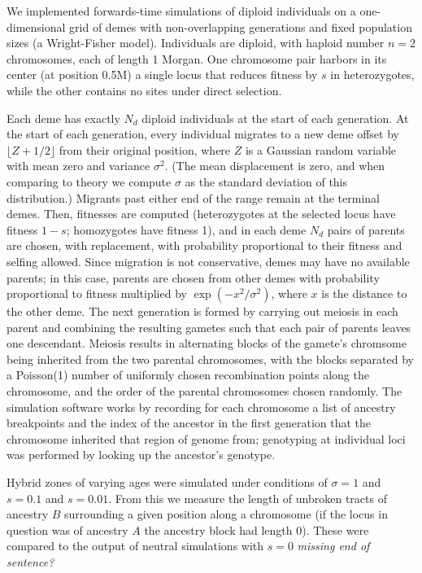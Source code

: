 \documentclass[11pt,letterpaper]{article}
\newcommand{\plr}[1]{{\em \color{blue} #1}}
\begin{document}
We implemented forwards-time simulations of diploid individuals on a one-dimensional grid of demes
with non-overlapping generations and fixed population sizes (a Wright-Fisher model). Individuals are diploid, with haploid number $n=2$ chromosomes, each of length 1 Morgan. One chromosome pair harbors in its center (at position 0.5M) a single locus that reduces fitness by $s$ in heterozygotes, while the other contains no sites under direct selection.

Each deme has exactly $N_d$ diploid individuals at the start of each generation.
At the start of each generation, every individual migrates to a new deme  offset by $\lfloor Z + 1/2 \rfloor$ from their original position,
where $Z$ is a Gaussian random variable with mean zero and variance $\sigma^2$.
(The mean displacement is zero, and when comparing to theory we compute $\sigma$ as the standard deviation of this distribution.)
Migrants past either end of the range remain at the terminal demes.
Then, 
fitnesses are computed (heterozygotes at the selected locus have fitness $1-s$; homozygotes have fitness 1),
and in each deme $N_d$ pairs of parents are chosen, with replacement,
with probability proportional to their fitness and selfing allowed.
Since migration is not conservative, demes may have no available parents;
in this case, parents are chosen from other demes with probability proportional to fitness
multiplied by $\exp(-x^2/\sigma^2)$, where $x$ is the distance to the other deme.
The next generation is formed by carrying out meiosis in each parent
and combining the resulting gametes such that each pair of parents leaves one descendant.
Meiosis results in alternating blocks of the gamete's chromsome
being inherited from the two parental chromosomes,
with the blocks separated by a Poisson(1) number of uniformly chosen recombination points along the chromosome,
and the order of the parental chromosomes chosen randomly.
The simulation software works by recording for each chromosome
a list of ancestry breakpoints and the index of the ancestor in the first generation
that the chromosome inherited that region of genome from;
genotyping at individual loci was performed by looking up the ancestor's genotype.

Hybrid zones of varying ages were simulated under conditions of $\sigma=1$ and $s=0.1$ and $s=0.01$. From this we measure the length of unbroken tracts of ancestry $B$ surrounding a given position along a chromosome (if the locus in question was of ancestry $A$ the ancestry block had length $0$). These were compared to the output of neutral simulations with $s=0$
\plr{missing end of sentence?}
\end{document}
